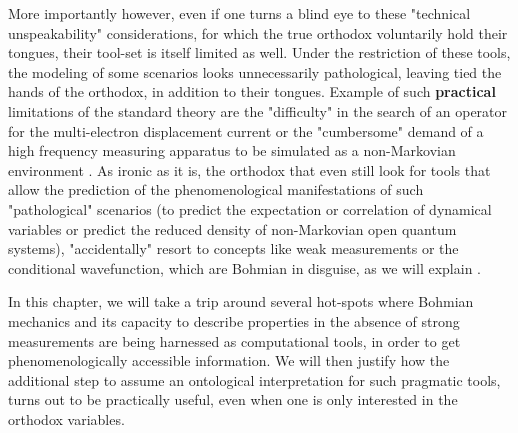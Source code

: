\documentclass[11pt, a4paper]{article} %
\begin{document}
More importantly however, even if one turns a blind eye to these "technical unspeakability" considerations, for which the true orthodox voluntarily hold their tongues, their tool-set is itself limited as well. Under the restriction of these tools, the modeling of some scenarios looks unnecessarily pathological, leaving tied the hands of the orthodox, in addition to their tongues. Example of such {\bf practical} limitations of the standard theory are the "difficulty" in the search of an operator for the multi-electron displacement current \cite{equiv, Pel} or the "cumbersome" demand of a high frequency measuring apparatus to be simulated as a non-Markovian environment \cite{Thz}. As ironic as it is, the orthodox that even still look for tools that allow the prediction of the phenomenological manifestations of such "pathological" scenarios (to predict the expectation or correlation of dynamical variables or predict the reduced density of non-Markovian open quantum systems), "accidentally" resort to concepts like weak measurements or the conditional wavefunction, which are Bohmian in disguise, as we will explain \cite{interpretSSE,NMisModal}.\vspace{-0.1cm}

In this chapter, we will take a trip around several hot-spots where Bohmian mechanics and its capacity to describe properties in the absence of strong measurements are being harnessed as computational tools, in order to get phenomenologically accessible information. We will then justify how the additional step to assume an ontological interpretation for such pragmatic tools, turns out to be practically useful, even when one is only interested in the orthodox variables.

\end{document}
